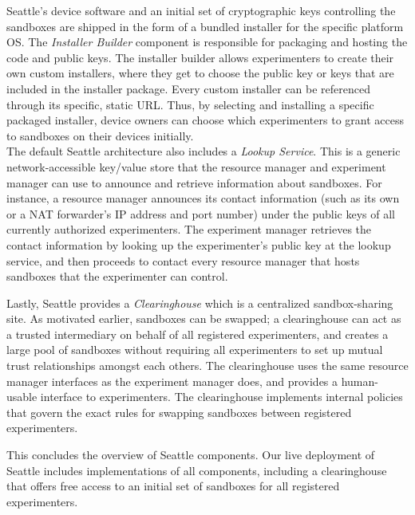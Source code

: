 Seattle's device software and an initial set of cryptographic
keys controlling the sandboxes are shipped in the form of a bundled
installer for the specific platform \gls{OS}.
The \textit{Installer Builder} component is responsible for
packaging and hosting the code and public keys.
The installer builder allows experimenters to create their own
custom installers, where they get to choose the public key or keys
that are included in the installer package. Every custom installer
can be referenced through its specific, static \gls{URL}.
Thus, by selecting and installing a specific packaged installer,
device owners can choose which experimenters to grant
access to sandboxes on their devices initially.
\\


The default Seattle architecture also includes a
\textit{Lookup Service}. This is a generic network-accessible
key/value store that the resource manager and experiment manager
can use to announce and retrieve information about sandboxes.
For instance, a resource manager announces its contact information
(such as its own or a NAT forwarder's IP address and port number) under
the public keys of all currently authorized experimenters.
The experiment manager retrieves the contact information by looking up
the experimenter's public key at the lookup service, and then
proceeds to contact every resource manager that hosts sandboxes
that the experimenter can control.

Lastly, Seattle provides a \textit{Clearinghouse} which is a
centralized sandbox-sharing site. As motivated earlier,
sandboxes can be swapped; a clearinghouse can act as a trusted
intermediary on behalf of all registered experimenters, and creates
a large pool of sandboxes without requiring all experimenters to
set up mutual trust relationships amongst each others.
The clearinghouse uses the same resource manager interfaces as the
experiment manager does, and provides a human-usable interface to
experimenters. The clearinghouse implements internal policies
that govern the exact rules for swapping sandboxes between
registered experimenters.

This concludes the overview of Seattle components. Our live deployment
of Seattle includes implementations of all components, including a
clearinghouse that offers free access to an initial set of sandboxes
for all registered experimenters.




